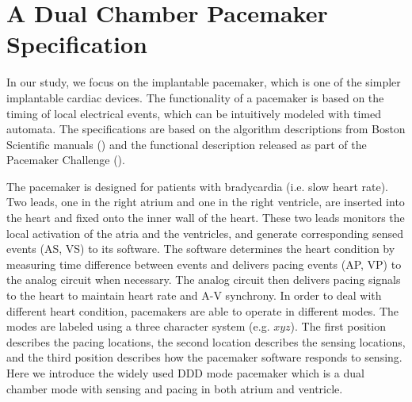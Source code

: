\section{A Dual Chamber Pacemaker Specification}
In our study, we focus on the implantable pacemaker, which is one of the simpler implantable cardiac devices.
The functionality of a pacemaker is based on the timing of local electrical events, which can be intuitively modeled with timed automata. 
The specifications are based on the algorithm descriptions from Boston Scientific manuals (\cite{compass}) and the functional description released as part of the Pacemaker Challenge (\cite{challenge}). 


The pacemaker is designed for patients with bradycardia (i.e. slow heart rate). Two leads, one in the right atrium and one in the right ventricle, are inserted into the heart and fixed onto the inner wall of the heart. These two leads monitors the local activation of the atria and the ventricles, and generate corresponding sensed events \textsf{(AS, VS)} to its software. The software determines the heart condition by measuring time difference between events and delivers pacing events \textsf{(AP, VP)} to the analog circuit when necessary. The analog circuit then delivers pacing signals to the heart to maintain heart rate and A-V synchrony. In order to deal with different heart condition, pacemakers are able to operate in different modes. The modes are labeled using a three character system (e.g. $xyz$). The first position describes the pacing locations, the second location describes the sensing locations, and the third position describes how the pacemaker software responds to sensing. Here we introduce the widely used DDD mode pacemaker which is a dual chamber mode with sensing and pacing in both atrium and ventricle. 


